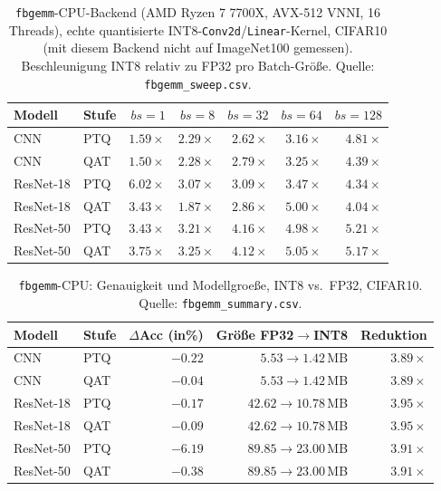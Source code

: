 \begin{table}[t]
\centering
\small
\caption{\texttt{fbgemm}-CPU-Backend (AMD Ryzen 7 7700X, AVX-512 VNNI, 16 Threads), echte quantisierte INT8-\texttt{Conv2d}/\texttt{Linear}-Kernel, CIFAR10 (mit diesem Backend nicht auf ImageNet100 gemessen). Beschleunigung INT8 relativ zu FP32 pro Batch-Größe. Quelle: \texttt{fbgemm\_sweep.csv}.}
\label{tab:fbgemmcpu}
\begin{tabular}{ll rrrrr}
\toprule
Modell & Stufe & $bs{=}1$ & $bs{=}8$ & $bs{=}32$ & $bs{=}64$ & $bs{=}128$ \\
\midrule
CNN & PTQ & $1.59\times$ & $2.29\times$ & $2.62\times$ & $3.16\times$ & $4.81\times$ \\
CNN & QAT & $1.50\times$ & $2.28\times$ & $2.79\times$ & $3.25\times$ & $4.39\times$ \\
ResNet-18 & PTQ & $6.02\times$ & $3.07\times$ & $3.09\times$ & $3.47\times$ & $4.34\times$ \\
ResNet-18 & QAT & $3.43\times$ & $1.87\times$ & $2.86\times$ & $5.00\times$ & $4.04\times$ \\
ResNet-50 & PTQ & $3.43\times$ & $3.21\times$ & $4.16\times$ & $4.98\times$ & $5.21\times$ \\
ResNet-50 & QAT & $3.75\times$ & $3.25\times$ & $4.12\times$ & $5.05\times$ & $5.17\times$ \\
\bottomrule
\end{tabular}
\end{table}

\begin{table}[t]
\centering
\small
\caption{\texttt{fbgemm}-CPU: Genauigkeit und Modellgroeße, INT8 vs.\ FP32, CIFAR10. Quelle: \texttt{fbgemm\_summary.csv}.}
\label{tab:fbgemmcpu-acc}
\begin{tabularx}{\textwidth}{ll rrr}
\toprule
Modell & Stufe & $\Delta$Acc (in\%) & Größe FP32$\to$INT8 & Reduktion \\
\midrule
CNN & PTQ & $-0.22$ & $5.53\to1.42$\,MB & $3.89\times$ \\
CNN & QAT & $-0.04$ & $5.53\to1.42$\,MB & $3.89\times$ \\
ResNet-18 & PTQ & $-0.17$ & $42.62\to10.78$\,MB & $3.95\times$ \\
ResNet-18 & QAT & $-0.09$ & $42.62\to10.78$\,MB & $3.95\times$ \\
ResNet-50 & PTQ & $-6.19$ & $89.85\to23.00$\,MB & $3.91\times$ \\
ResNet-50 & QAT & $-0.38$ & $89.85\to23.00$\,MB & $3.91\times$ \\
\bottomrule
\end{tabularx}
\end{table}

